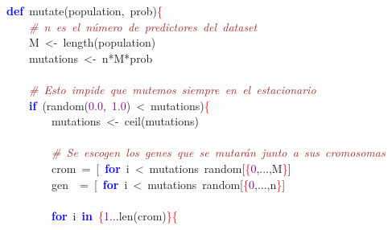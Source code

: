 \noindent
\mbox{}\textbf{\textcolor{Blue}{def}}\ mutate\textcolor{BrickRed}{(}population\textcolor{BrickRed}{,}\ prob\textcolor{BrickRed}{)}\textcolor{Red}{\{} \\
\mbox{}\ \ \ \ \textit{\textcolor{Brown}{\#\ n\ es\ el\ número\ de\ predictores\ del\ dataset}} \\
\mbox{}\ \ \ \ M\ \textcolor{BrickRed}{\textless{}-}\ length\textcolor{BrickRed}{(}population\textcolor{BrickRed}{)} \\
\mbox{}\ \ \ \ mutations\ \textcolor{BrickRed}{\textless{}-}\ n\textcolor{BrickRed}{*}M\textcolor{BrickRed}{*}prob \\
\mbox{} \\
\mbox{}\ \ \ \ \textit{\textcolor{Brown}{\#\ Esto\ impide\ que\ mutemos\ siempre\ en\ el\ estacionario}} \\
\mbox{}\ \ \ \ \textbf{\textcolor{Blue}{if}}\ \textcolor{BrickRed}{(}random\textcolor{BrickRed}{(}\textcolor{Purple}{0.0}\textcolor{BrickRed}{,}\ \textcolor{Purple}{1.0}\textcolor{BrickRed}{)}\ \textcolor{BrickRed}{\textless{}}\ mutations\textcolor{BrickRed}{)}\textcolor{Red}{\{} \\
\mbox{}\ \ \ \ \ \ \ \ mutations\ \textcolor{BrickRed}{\textless{}-}\ ceil\textcolor{BrickRed}{(}mutations\textcolor{BrickRed}{)} \\
\mbox{} \\
\mbox{}\ \ \ \ \ \ \ \ \textit{\textcolor{Brown}{\#\ Se\ escogen\ los\ genes\ que\ se\ mutarán\ junto\ a\ sus\ cromosomas}} \\
\mbox{}\ \ \ \ \ \ \ \ crom\ \textcolor{BrickRed}{=}\ \textcolor{BrickRed}{[}\ \textbf{\textcolor{Blue}{for}}\ i\ \textcolor{BrickRed}{\textless{}}\ mutations\ random\textcolor{BrickRed}{[}\textcolor{Red}{\{}\textcolor{Purple}{0}\textcolor{BrickRed}{,...,}M\textcolor{Red}{\}}\textcolor{BrickRed}{]} \\
\mbox{}\ \ \ \ \ \ \ \ gen\ \ \textcolor{BrickRed}{=}\ \textcolor{BrickRed}{[}\ \textbf{\textcolor{Blue}{for}}\ i\ \textcolor{BrickRed}{\textless{}}\ mutations\ random\textcolor{BrickRed}{[}\textcolor{Red}{\{}\textcolor{Purple}{0}\textcolor{BrickRed}{,...,}n\textcolor{Red}{\}}\textcolor{BrickRed}{]} \\
\mbox{} \\
\mbox{}\ \ \ \ \ \ \ \ \textbf{\textcolor{Blue}{for}}\ i\ \textbf{\textcolor{Blue}{in}}\ \textcolor{Red}{\{}\textcolor{Purple}{1}\textcolor{BrickRed}{...}len\textcolor{BrickRed}{(}crom\textcolor{BrickRed}{)}\textcolor{Red}{\}\{} \\
